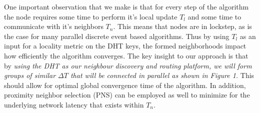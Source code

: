 \documentclass[12pt,notitlepage]{article}
\begin{document}
One important observation that we make is that for every step of the algorithm
the node requires some time to perform it's local update $T_{l}$ and 
some time to communicate with it's neighbors $T_{n}$. This means that nodes
are in lockstep, as is the case for many parallel discrete event based 
algorithms.  Thus by using $T_{l}$ as an input for a locality metric on the DHT
 keys, the formed neighborhoods impact how efficiently the algorithm
converges. The key insight to our approach is that by {\it using the DHT as
our neighbour discovery and routing platform, we will form groups of similar 
$\Delta T$ that will be connected in parallel as shown in Figure 1.}
This should allow for optimal global convergence time of the algorithm.
In addition, proximity neighbor selection (PNS) 
can be employed as well to minimize for the underlying network latency 
that exists within $T_{n}$. 
\end{document}
